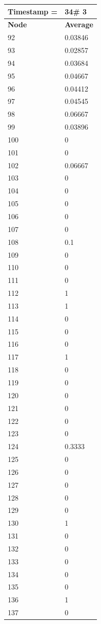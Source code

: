 \begin{tabular}{|l||l|}
\hline
\textbf{Timestamp =} & \textbf{34}\# 3\\\hline
	\textbf{Node} & \textbf{Average} \\ \hline
\hline
	92 & 0.03846 \\ \hline
	93 & 0.02857 \\ \hline
	94 & 0.03684 \\ \hline
	95 & 0.04667 \\ \hline
	96 & 0.04412 \\ \hline
	97 & 0.04545 \\ \hline
	98 & 0.06667 \\ \hline
	99 & 0.03896 \\ \hline
	100 & 0 \\ \hline
	101 & 0 \\ \hline
	102 & 0.06667 \\ \hline
	103 & 0 \\ \hline
	104 & 0 \\ \hline
	105 & 0 \\ \hline
	106 & 0 \\ \hline
	107 & 0 \\ \hline
	108 & 0.1 \\ \hline
	109 & 0 \\ \hline
	110 & 0 \\ \hline
	111 & 0 \\ \hline
	112 & 1 \\ \hline
	113 & 1 \\ \hline
	114 & 0 \\ \hline
	115 & 0 \\ \hline
	116 & 0 \\ \hline
	117 & 1 \\ \hline
	118 & 0 \\ \hline
	119 & 0 \\ \hline
	120 & 0 \\ \hline
	121 & 0 \\ \hline
	122 & 0 \\ \hline
	123 & 0 \\ \hline
	124 & 0.3333 \\ \hline
	125 & 0 \\ \hline
	126 & 0 \\ \hline
	127 & 0 \\ \hline
	128 & 0 \\ \hline
	129 & 0 \\ \hline
	130 & 1 \\ \hline
	131 & 0 \\ \hline
	132 & 0 \\ \hline
	133 & 0 \\ \hline
	134 & 0 \\ \hline
	135 & 0 \\ \hline
	136 & 1 \\ \hline
	137 & 0 \\ \hline
\end{tabular}

